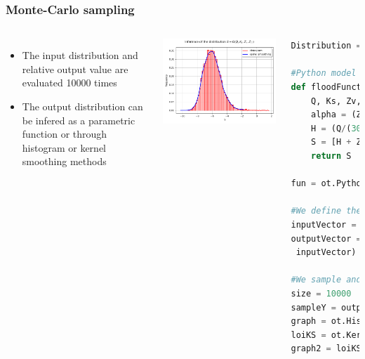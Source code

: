 \documentclass[aspectratio=169]{beamer}
\begin{document}
\begin{frame}[containsverbatim]
\frametitle{Monte-Carlo sampling}

\scriptsize{

\begin{columns}

\begin{itemize}
\item The input distribution and relative output value are evaluated 10000 times
\item The output distribution can be infered as a parametric function or through histogram or kernel smoothing methods
\end{itemize}

    \includegraphics[width=1.\textwidth]{figures/S.png}

    
\tiny 
\begin{lstlisting}[language=Python, numbers = none]
Distribution = ot.ComposedDistribution([Q,Ks,Zv,Zm])

#Python model
def floodFunction(X):
    Q, Ks, Zv, Zm = X
    alpha = (Zm - Zv)/5.0e3
    H = (Q/(300.0*Ks*np.sqrt(alpha)))**0.6
    S = [H + Zv - 58.5]
    return S

fun = ot.PythonFunction(4,1,floodFunction)

#We define the output as a random vector
inputVector = ot.RandomVector(Distribution)
outputVector = ot.CompositeRandomVector(fun,
 inputVector)

#We sample and infere the output distribution
size = 10000
sampleY = outputVector.getSample(size)
graph = ot.HistogramFactory().build(sampleY).drawPDF()
loiKS = ot.KernelSmoothing().build(sampleY)
graph2 = loiKS.drawPDF()

\end{lstlisting}

	
\end{columns}


}



\end{frame}
\end{document}
